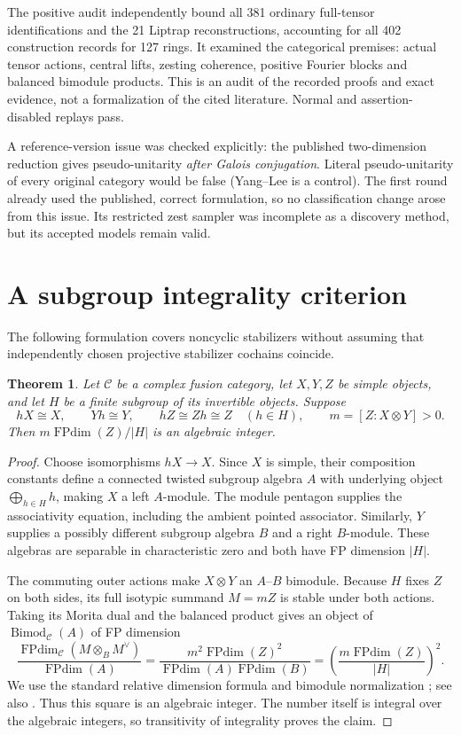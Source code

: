 \documentclass[11pt]{article}
\newtheorem{theorem}{Theorem}[section]\newtheorem{lemma}[theorem]{Lemma}\newtheorem{proposition}[theorem]{Proposition}
\newcommand{\FPdim}{\operatorname{FPdim}}\renewcommand{\Vec}{\operatorname{Vec}}\newcommand{\Rep}{\operatorname{Rep}}\newcommand{\Irr}{\operatorname{Irr}}
\begin{document}
The positive audit independently bound all 381 ordinary full-tensor identifications
and the 21 Liptrap reconstructions, accounting for all 402 construction records for
127 rings. It examined the categorical premises: actual tensor actions, central lifts,
zesting coherence, positive Fourier blocks and balanced bimodule products. This is
an audit of the recorded proofs and exact evidence, not a formalization of the cited
literature. Normal and assertion-disabled replays pass.

A reference-version issue was checked explicitly: the published two-dimension
reduction \cite[Lemma 3.1]{Sch} gives pseudo-unitarity \emph{after Galois conjugation}.
Literal pseudo-unitarity of every original category would be false (Yang--Lee is
a control). The first round already used the published, correct formulation, so no
classification change arose from this issue. Its restricted zest sampler was incomplete
as a discovery method, but its accepted models remain valid.

\section{A subgroup integrality criterion}
The following formulation covers noncyclic stabilizers without assuming that
independently chosen projective stabilizer cochains coincide.

\begin{theorem}\label{thm:stabilizer}
Let $\mathcal C$ be a complex fusion category, let $X,Y,Z$ be simple objects, and
let $H$ be a finite subgroup of its invertible objects. Suppose
\[
 hX\cong X,\qquad Yh\cong Y,\qquad hZ\cong Zh\cong Z\quad(h\in H),
 \qquad m=[Z:X\otimes Y]>0.
\]
Then $m\FPdim(Z)/|H|$ is an algebraic integer.
\end{theorem}
\begin{proof}
Choose isomorphisms $hX\to X$. Since $X$ is simple, their composition constants
define a connected twisted subgroup algebra $A$ with underlying object
$\bigoplus_{h\in H}h$, making $X$ a left $A$-module. The module pentagon supplies
the associativity equation, including the ambient pointed associator. Similarly,
$Y$ supplies a possibly different subgroup algebra $B$ and a right $B$-module.
These algebras are separable in characteristic zero and both have FP dimension $|H|$.

The commuting outer actions make $X\otimes Y$ an $A$--$B$ bimodule. Because $H$
fixes $Z$ on both sides, its full isotypic summand $M=mZ$ is stable under both actions.
Taking its Morita dual and the balanced product gives an object of
$\operatorname{Bimod}_{\mathcal C}(A)$ of FP dimension
\[
 \frac{\FPdim_{\mathcal C}(M\otimes_B M^\vee)}{\FPdim(A)}
 =\frac{m^2\FPdim(Z)^2}{\FPdim(A)\FPdim(B)}
 =\left(\frac{m\FPdim(Z)}{|H|}\right)^2.
\]
We use the standard relative dimension formula and bimodule normalization
\cite[Chapter 7]{EGNO}; see also \cite[Corollary 3.32 and Proposition 3.34]{Sanford}.
Thus this square is an algebraic integer. The number itself is integral over the
algebraic integers, so transitivity of integrality proves the claim.
\end{proof}
\end{document}
